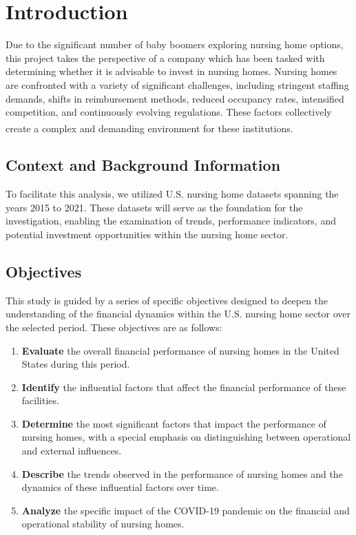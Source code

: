 \documentclass{article}
\theoremstyle{mytheoremstyle}
\theoremstyle{mytheoremstyle}
\theoremstyle{myproblemstyle}
\begin{document}
\section{Introduction}

Due to the significant number of baby boomers exploring nursing home options, this project takes the perspective of a company which has been tasked with determining whether it is advisable to invest in nursing homes. Nursing homes are confronted with a variety of significant challenges, including stringent staffing demands, shifts in reimbursement methods, reduced occupancy rates, intensified competition, and continuously evolving regulations. These factors collectively create a complex and demanding environment for these institutions.\textsuperscript{\cite{tyler2017rebalance}}

\subsection{Context and Background Information}

To facilitate this analysis, we utilized U.S. nursing home datasets spanning the years 2015 to 2021. These datasets will serve as the foundation for the investigation, enabling the examination of trends, performance indicators, and potential investment opportunities within the nursing home sector.

\subsection{Objectives}

This study is guided by a series of specific objectives designed to deepen the understanding of the financial dynamics within the U.S. nursing home sector over the selected period. These objectives are as follows:

\begin{enumerate}
    \item \textbf{Evaluate} the overall financial performance of nursing homes in the United States during this period.
    \item \textbf{Identify} the influential factors that affect the financial performance of these facilities.
    \item \textbf{Determine} the most significant factors that impact the performance of nursing homes, with a special emphasis on distinguishing between operational and external influences.
    \item \textbf{Describe} the trends observed in the performance of nursing homes and the dynamics of these influential factors over time.
    \item \textbf{Analyze} the specific impact of the COVID-19 pandemic on the financial and operational stability of nursing homes.
\end{enumerate}
\end{document}
